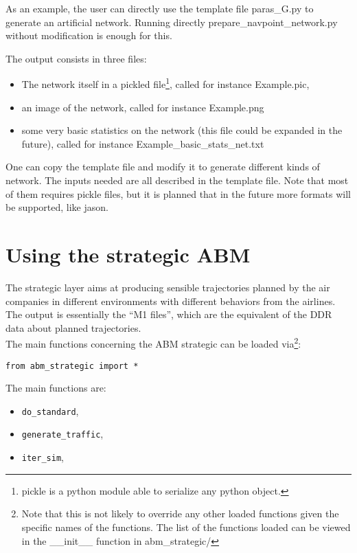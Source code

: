 \documentclass[12pt]{article}
\begin{document}
As an example, the user can directly use the template file paras\_G.py to generate an artificial network. Running directly prepare\_navpoint\_network.py without modification is enough for this.

The output consists in three files: 
\begin{itemize}
\item The network itself in a pickled file\footnote{pickle is a python module able to serialize any python object.}, called for instance Example.pic,
\item an image of the network, called for instance Example.png
\item some very basic statistics on the network (this file could be expanded in the future), called for instance Example\_basic\_stats\_net.txt
\end{itemize}

One can copy the template file and modify it to generate different kinds of network. The inputs needed are all described in the template file. Note that most of them requires pickle files, but it is planned that in the future more formats will be supported, like jason.

\section{Using the strategic ABM}
The strategic layer aims at producing sensible trajectories planned by the air companies in different environments with different behaviors from the airlines. The output is essentially the ``M1 files'', which are the equivalent of the DDR data about planned trajectories.
\\

The main functions concerning the ABM strategic can be loaded via\footnote{Note that this is not likely to override any other loaded functions given the specific names of the functions. The list of the functions loaded can be viewed in the \_\_init\_\_ function in abm\_strategic/}:
\begin{verbatim}
from abm_strategic import *
\end{verbatim}

The main functions are:
\begin{itemize}
\item \verb|do_standard|,
\item \verb|generate_traffic|,
\item \verb|iter_sim|,
\end{itemize}
\end{document}
